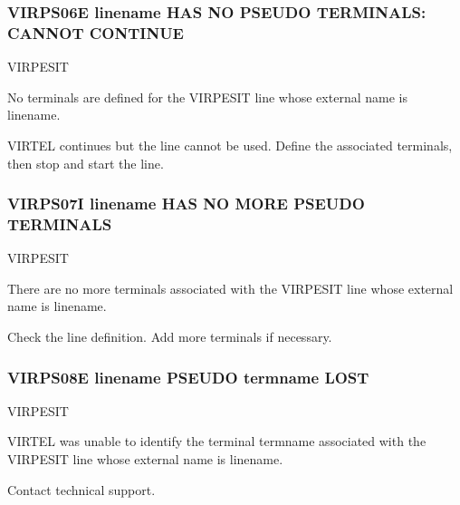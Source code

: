 \documentclass[letterpaper,10pt,english]{sphinxmanual}
\begin{document}
\subsubsection{VIRPS06E linename HAS NO PSEUDO TERMINALS: CANNOT CONTINUE}
\label{\detokenize{messages:virps06e-linename-has-no-pseudo-terminals-cannot-continue}}\begin{description}
\sphinxAtStartPar
VIRPESIT

\sphinxAtStartPar
No terminals are defined for the VIRPESIT line whose external name is linename.

\sphinxAtStartPar
VIRTEL continues but the line cannot be used. Define the associated terminals, then stop and start the line.

\end{description}


\subsubsection{VIRPS07I linename HAS NO MORE PSEUDO TERMINALS}
\label{\detokenize{messages:virps07i-linename-has-no-more-pseudo-terminals}}\begin{description}
\sphinxAtStartPar
VIRPESIT

\sphinxAtStartPar
There are no more terminals associated with the VIRPESIT line whose external name is linename.

\sphinxAtStartPar
Check the line definition. Add more terminals if necessary.

\end{description}


\subsubsection{VIRPS08E linename PSEUDO termname LOST}
\label{\detokenize{messages:virps08e-linename-pseudo-termname-lost}}\begin{description}
\sphinxAtStartPar
VIRPESIT

\sphinxAtStartPar
VIRTEL was unable to identify the terminal termname associated with the VIRPESIT line whose external name is linename.

\sphinxAtStartPar
Contact technical support.

\end{description}
\end{document}
